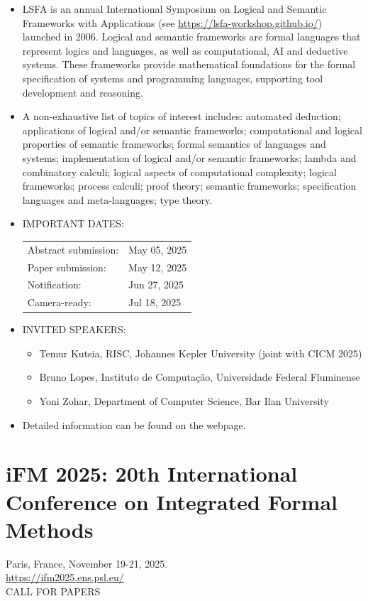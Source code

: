 \documentclass[prodmode,acmtecs]{acmsmall} %
\begin{document}
\begin{itemize}\item  LSFA is an annual International Symposium on Logical and Semantic Frameworks with Applications (see \href{https://lsfa-workshop.github.io/}{https://lsfa-workshop.github.io/}) launched in 2006. Logical and semantic frameworks are formal languages that represent logics and languages, as well as computational, AI and deductive systems. These frameworks provide mathematical foundations for the formal specification of systems and programming languages, supporting tool development and reasoning. 
 
\item  A non-exhaustive list of topics of interest includes: automated deduction; applications of logical and/or semantic frameworks; computational and logical properties of semantic frameworks; formal semantics of languages and systems; implementation of logical and/or semantic frameworks; lambda and combinatory calculi; logical aspects of computational complexity; logical frameworks; process calculi; proof theory; semantic frameworks; specification languages and meta-languages; type theory. 
 
\item  IMPORTANT DATES: 
 
\begin{tabulary}{\linewidth}{LL}Abstract submission:  & May 05, 2025 \\
Paper submission:  & May 12, 2025 \\
Notification:  & Jun 27, 2025 \\
Camera-ready:  & Jul 18, 2025 \\
\end{tabulary}
 
\item  INVITED SPEAKERS: 
 
\begin{itemize}\item  Temur Kutsia, RISC, Johannes Kepler University (joint with CICM 2025)
\item  Bruno Lopes, Instituto de Computação, Universidade Federal Fluminense
\item  Yoni Zohar, Department of Computer Science, Bar Ilan University
\end{itemize} 
\item  Detailed information can be found on the webpage. 
 
\end{itemize}\section{iFM 2025: 20th International Conference on Integrated Formal Methods}\label{iFM2025}  Paris, France, November 19-21, 2025.\\ 
  \href{https://ifm2025.ens.psl.eu/}{https://ifm2025.ens.psl.eu/}\\ 
CALL FOR PAPERS  
\end{document}
